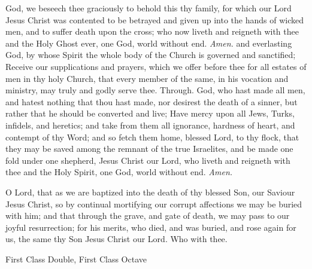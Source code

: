 
     God, we beseech thee graciously to behold this thy family, for which our Lord Jesus Christ was contented to be betrayed and given up into the hands of wicked men, and to suffer death upon the cross; who now liveth and reigneth with thee and the Holy Ghost ever, one God, world without end. \textit{Amen.}
     and everlasting God, by whose Spirit the whole body of the Church is governed and sanctified; Receive our supplications and prayers, which we offer before thee for all estates of men in thy holy Church, that every member of the same, in his vocation and ministry, may truly and godly serve thee. Through.
     God, who hast made all men, and hatest nothing that thou hast made, nor desirest the death of a sinner, but rather that he should be converted and live; Have mercy upon all Jews, Turks, infidels, and heretics; and take from them all ignorance, hardness of heart, and contempt of thy Word; and so fetch them home, blessed Lord, to thy flock, that they may be saved among the remnant of the true Israelites, and be made one fold under one shepherd, Jesus Christ our Lord, who liveth and reigneth with thee and the Holy Spirit, one God, world without end. \textit{Amen.}
    
     O Lord, that as we are baptized into the death of thy blessed Son, our Saviour Jesus Christ, so by continual mortifying our corrupt affections we may be buried with him; and that through the grave, and gate of death, we may pass to our joyful resurrection; for his merits, who died, and was buried, and rose again for us, the same thy Son Jesus Christ our Lord. Who with thee.

\begin{inhead}
    {First Class Double, First Class Octave}
\end{inhead}
\par\noindent
{}

